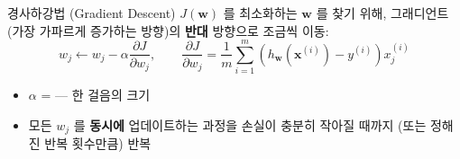 \begin{frame}{경사하강법 (Gradient Descent)}
  $J(\boldsymbol{w})$ 를 최소화하는 $\boldsymbol{w}$ 를 찾기 위해, 그래디언트(가장 가파르게
  증가하는 방향)의 \textbf{반대} 방향으로 조금씩 이동:
  \[
  w_j \leftarrow w_j - \alpha \frac{\partial J}{\partial w_j}, \hspace{2em}
  \frac{\partial J}{\partial w_j} = \frac{1}{m}\sum_{i=1}^m
  \left(h_{\boldsymbol{w}}(\boldsymbol{x}^{(i)}) - y^{(i)}\right) x_j^{(i)}
  \]
  \begin{itemize}
    \item $\alpha$ =  --- 한 걸음의 크기
    \item 모든 $w_j$ 를 \textbf{동시에} 업데이트하는 과정을 손실이 충분히
      작아질 때까지 (또는 정해진 반복 횟수만큼) 반복
  \end{itemize}
\end{frame}
